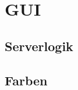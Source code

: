 \documentclass[12pt]{article}
\begin{document}
\newpage
\pagestyle{fancy}
\fancyhead{}
\section{GUI}
\label{gui}

\subsection{Serverlogik}
\label{serverlogik}


\newpage
\pagestyle{fancy}
\fancyhead{}
\subsection{Farben}


 
\end{document}
